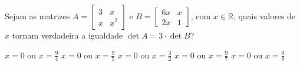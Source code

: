 Sejam as matrizes $A = \left[ \begin{array}{cc}
3 & x \\
x & x^2
\end{array} \right]$ e $B = \left[ \begin{array}{cc}
6x & x \\
2x & 1
\end{array} \right]$, com $x\in\mathbb{R}$, quais valores de $x$ tornam verdadeira a igualdade $\det A=3\cdot\det B$?

$x=0$ ou $x=\frac{9}{4}$
$x=0$ ou $x=\frac{9}{5}$
$x=0$ ou $x=\frac{3}{2}$
$x=0$ ou $x=\frac{9}{7}$
$x=0$ ou $x=\frac{9}{8}$


